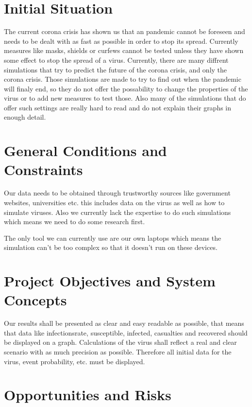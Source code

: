 \documentclass[12pt]{article}
\theoremstyle{definition}
\begin{document}
\pagebreak

\section{Initial Situation}

The current corona crisis has shown us that an pandemic cannot be foreseen and needs to be dealt with as fast as possible in order to stop its spread.
Currently measures like masks, shields or curfews cannot be tested unless they have shown some effect to stop the spread of a virus.
Currently, there are many diffrent simulations that try to predict the future of the corona crisis,
and only the corona crisis. Those simulations are made to try to find out when the pandemic will finaly end,
so they do not offer the possability to change the properties of the virus or to add new measures to test those.
Also many of the simulations that do offer such settings are really hard to read and do not explain their graphs in enough detail.

\pagebreak

\section{General Conditions and Constraints}

Our data needs to be obtained through trustworthy sources like government websites, universities etc. this includes data on the virus as well as how to simulate viruses.
Also we currently lack the expertise to do such simulations which means we need to do some research first.

The only tool we can currently use are our own laptops which means the simulation can't be too complex so that it doesn't run on these devices.

\pagebreak

\section{Project Objectives and System Concepts}

Our results shall be presented as clear and easy readable as possible, 
that means that data like infectionsrate, susceptible, infected, casualties and recovered should be displayed on a graph.
Calculations of the virus shall reflect a real and clear scenario with as much precision as possible.
Therefore all initial data for the virus, event probability, etc. must be displayed.

\pagebreak
\section{Opportunities and Risks}
\end{document}
